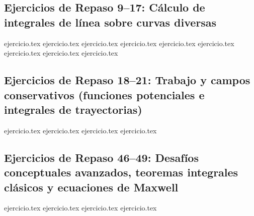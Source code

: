 \subsection*{Ejercicios de Repaso 9--17: Cálculo de integrales de línea sobre curvas diversas}
\begin{enumerate}
    \setcounter{enumi}{8}
    {ejercicio.tex}
    {ejercicio.tex}
    {ejercicio.tex}
    {ejercicio.tex}
    {ejercicio.tex}
    {ejercicio.tex}
    {ejercicio.tex}
    {ejercicio.tex}
    {ejercicio.tex}
\end{enumerate}

\subsection*{Ejercicios de Repaso 18--21: Trabajo y campos conservativos (funciones potenciales e integrales de trayectorias)}
\begin{enumerate}
    \setcounter{enumi}{17}
    {ejercicio.tex}
    {ejercicio.tex}
    {ejercicio.tex}
    {ejercicio.tex}
\end{enumerate}

\subsection*{Ejercicios de Repaso 46--49: Desafíos conceptuales avanzados, teoremas integrales clásicos y ecuaciones de Maxwell}
\begin{enumerate}
    \setcounter{enumi}{45}
    {ejercicio.tex}
    {ejercicio.tex}
    {ejercicio.tex}
    {ejercicio.tex}
\end{enumerate}
